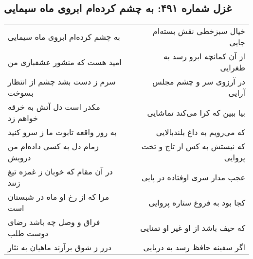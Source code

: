 \begin{center}
\section*{غزل شماره ۴۹۱: به چشم کرده‌ام ابروی ماه سیمایی}
\label{sec:sh491}
\begin{longtable}{l p{0.5cm} r}
به چشم کرده‌ام ابروی ماه سیمایی
&&
خیال سبزخطی نقش بسته‌ام جایی
\\
امید هست که منشور عشقبازی من
&&
از آن کمانچه ابرو رسد به طغرایی
\\
سرم ز دست بشد چشم از انتظار بسوخت
&&
در آرزوی سر و چشم مجلس آرایی
\\
مکدر است دل آتش به خرقه خواهم زد
&&
بیا ببین که کرا می‌کند تماشایی
\\
به روز واقعه تابوت ما ز سرو کنید
&&
که می‌رویم به داغ بلندبالایی
\\
زمام دل به کسی داده‌ام من درویش
&&
که نیستش به کس از تاج و تخت پروایی
\\
در آن مقام که خوبان ز غمزه تیغ زنند
&&
عجب مدار سری اوفتاده در پایی
\\
مرا که از رخ او ماه در شبستان است
&&
کجا بود به فروغ ستاره پروایی
\\
فراق و وصل چه باشد رضای دوست طلب
&&
که حیف باشد از او غیر او تمنایی
\\
درر ز شوق برآرند ماهیان به نثار
&&
اگر سفینه حافظ رسد به دریایی
\\
\end{longtable}
\end{center}
